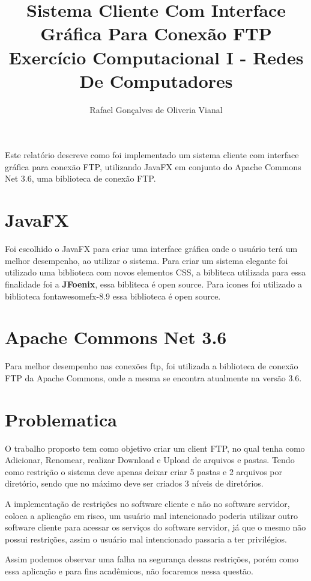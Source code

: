 \documentclass[12pt]{article}
\title{Sistema Cliente Com Interface Gráfica Para Conexão FTP \\ Exercício Computacional I - Redes De Computadores}
\author{Rafael Gonçalves de Oliveria Vianal\inst{1} }
\begin{document}
 

\maketitle

     
\begin{resumo} 	
  Este relatório descreve como foi implementado um sistema cliente com interface gráfica para conexão FTP, utilizando JavaFX em conjunto do Apache Commons Net 3.6, uma biblioteca de conexão FTP.
\end{resumo}


\section{JavaFX}
Foi escolhido o JavaFX para criar uma interface gráfica onde o usuário terá um melhor desempenho, ao utilizar o sistema.
Para criar um sistema elegante foi utilizado uma biblioteca com novos elementos CSS, a bibliteca utilizada para essa finalidade foi  a \textbf{JFoenix}, essa bibliteca é open source. Para icones foi utilizado a biblioteca fontawesomefx-8.9 essa biblioteca é open source.
	
\section{Apache Commons Net 3.6} \label{sec:firstpage}

Para melhor desempenho nas conexões ftp, foi utilizada a biblioteca de conexão FTP da Apache Commons, onde a mesma se encontra atualmente na versão 3.6.

\section{Problematica}
O trabalho proposto tem como objetivo criar um client FTP, no qual tenha como Adicionar, Renomear, realizar Download e Upload de arquivos e pastas. Tendo como restrição o sistema deve apenas deixar criar 5 pastas e 2 arquivos por diretório, sendo que no máximo deve ser criados 3 níveis de diretórios.
 
A implementação de restrições no software cliente e não no software servidor, coloca a aplicação em risco, um usuário mal intencionado poderia utilizar outro software cliente para acessar os serviços do software servidor, já que o mesmo não possui restrições, assim o usuário mal intencionado passaria a ter privilégios.

Assim podemos observar uma falha na segurança dessas restrições, porém como essa aplicação e para fins acadêmicos, não focaremos nessa questão.
\end{document}
